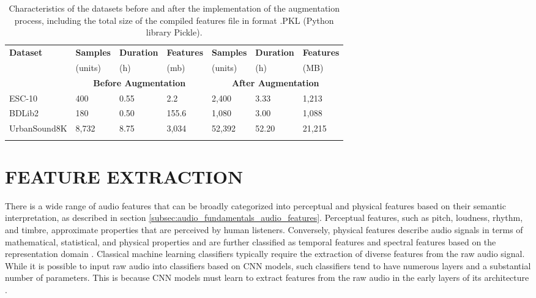 \begin{table}[ht!]
    \caption[Comparison between the original datasets and their augmented versions]{Characteristics of the datasets before and after the implementation of the augmentation process, including the total size of the compiled features file in format .PKL (Python library Pickle).}
    \label{table:summary_datasets_before_and_after_augmentation}
    \centering
    \begin{tabular}{p{2.7cm}|p{1.6cm}|p{1.7cm}|p{1.7cm}|p{1.6cm}|p{1.7cm}|p{1.7cm}}
        \Xhline{2\arrayrulewidth} 
        \rowcolor{lightgray}
        \textbf{Dataset} & \hfil\textbf{Samples} & \hfil\textbf{Duration} & \hfil\textbf{Features} & \hfil\textbf{Samples} & \hfil\textbf{Duration} & \hfil\textbf{Features}\\
        \rowcolor{lightgray}
          & \hfil (units) & \hfil (h) & \hfil (\gls{m}\gls{b}) & \hfil(units) & \hfil(h) & \hfil(MB)\\    
        \Xhline{2\arrayrulewidth}
        \rowcolor{gray!20} & \multicolumn{3}{c|}{\textbf{Before Augmentation}} & \multicolumn{3}{c}{\textbf{After Augmentation}} \\
        \hline
        ESC-10 & \hfil 400 & \hfil 0.55 & \hfil 2.2 & \hfil 2,400 & \hfil 3.33 & \hfil 1,213\\
        BDLib2 & \hfil 180 & \hfil 0.50 & \hfil 155.6 & \hfil 1,080 & \hfil 3.00 & \hfil 1,088\\
        UrbanSound8K & \hfil 8,732 & \hfil 8.75 & \hfil 3,034 & \hfil 52,392 & \hfil 52.20 & \hfil 21,215\\
        \Xhline{2\arrayrulewidth}
    \end{tabular}
\end{table}


\section{FEATURE EXTRACTION}
\label{sec:methods_feature_extraction}

There is a wide range of audio features that can be broadly categorized into perceptual and physical features based on their semantic interpretation, as described in section \ref{subsec:audio_fundamentals_audio_features}. Perceptual features, such as pitch, loudness, rhythm, and timbre, approximate properties that are perceived by human listeners. Conversely, physical features describe audio signals in terms of mathematical, statistical, and physical properties and are further classified as temporal features and spectral features based on the representation domain \cite{Lhoest2021}. Classical machine learning classifiers typically require the extraction of diverse features from the raw audio signal. While it is possible to input raw audio into classifiers based on CNN models, such classifiers tend to have numerous layers and a substantial number of parameters. This is because CNN models must learn to extract features from the raw audio in the early layers of its architecture \cite{Chu2023}.

